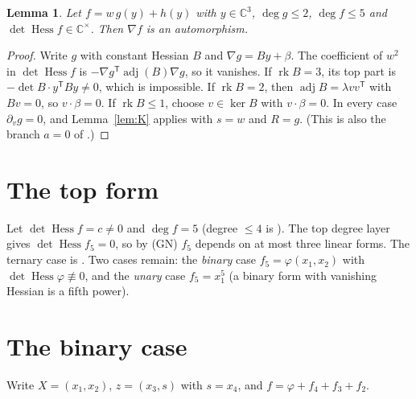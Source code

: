 \documentclass[11pt]{article}
\newtheorem{lemma}[theorem]{Lemma}
\theoremstyle{remark}
\newcommand{\C}{\mathbb{C}}
\newcommand{\Hess}{\operatorname{Hess}}
\newcommand{\adj}{\operatorname{adj}}
\begin{document}
\begin{lemma}\label{lem:L}
Let $f=w\,g(y)+h(y)$ with $y\in\C^3$, $\deg g\le2$, $\deg f\le5$ and $\det\Hess f\in\C^\times$. Then $\nabla f$ is an automorphism.
\end{lemma}
\begin{proof}
Write $g$ with constant Hessian $B$ and $\nabla g=By+\beta$. The coefficient of $w^2$ in $\det\Hess f$ is $-\nabla g^{\mathsf T}\adj(B)\nabla g$, so it vanishes. If $\operatorname{rk}B=3$, its top part is $-\det B\cdot y^{\mathsf T}By\ne0$, which is impossible. If $\operatorname{rk}B=2$, then $\adj B=\lambda vv^{\mathsf T}$ with $Bv=0$, so $v\cdot\beta=0$. If $\operatorname{rk}B\le1$, choose $v\in\ker B$ with $v\cdot\beta=0$. In every case $\partial_vg=0$, and Lemma~\ref{lem:K} applies with $s=w$ and $R=g$. (This is also the branch $a=0$ of \cite[Prop.~6.1]{Ni}.)
\end{proof}

\section{The top form}
Let $\det\Hess f=c\ne0$ and $\deg f=5$ (degree $\le4$ is \cite{Ni}). The top degree layer gives $\det\Hess f_5=0$, so by (GN) $f_5$ depends on at most three linear forms. The ternary case is \cite{NGtern}. Two cases remain: the \emph{binary} case $f_5=\varphi(x_1,x_2)$ with $\det\Hess\varphi\not\equiv0$, and the \emph{unary} case $f_5=x_1^5$ (a binary form with vanishing Hessian is a fifth power).

\section{The binary case}\label{sec:bin}
Write $X=(x_1,x_2)$, $z=(x_3,s)$ with $s=x_4$, and $f=\varphi+f_4+f_3+f_2$.
\end{document}
